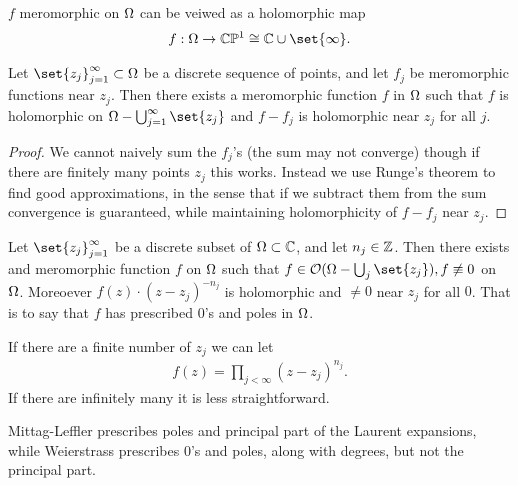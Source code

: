 \begin{remark}
    $f$ meromorphic on $\Omega$ can be veiwed as a holomorphic map
    \begin{align*}
        f: \om \to \C \mathbb{P}^1 \cong \C \cup \set{\infty}.
    \end{align*}
\end{remark}

\begin{theorem}
    Let $\set{z_j}_{j=1}^\infty \subset \om$ be a discrete sequence of points, and let $f_j$ be meromorphic functions near $z_j$. Then there exists a meromorphic function $f$ in $\Omega$ such that $f$ is holomorphic on $\om - \bigcup_{j=1}^\infty \set{z_j}$ and $f - f_j$ is holomorphic near $z_j$ for all $j$.
\end{theorem}


\begin{proof}
    We cannot naively sum the $f_j$'s (the sum may not converge) though if there are finitely many points $z_j$ this works. Instead we use Runge's theorem to find good approximations, in the sense that if we subtract them from the sum convergence is guaranteed, while maintaining holomorphicity of $f-f_j$ near $z_j$.
\end{proof}

\begin{theorem}
    Let $\set{z_j}_{j=1}^\infty$ be a discrete subset of $\Omega \subset \mathbb{C}$, and let $n_j \in \mathbb{Z}$. Then there exists and meromorphic function $f $ on $\Omega$ such that $f \in \O(\om - \bigcup_{j} \set{z_j}), f \not\equiv 0$ on $\Omega$. Moreoever $f(z) \cdot (z-z_j)^{-n_j}$ is holomorphic and $\neq 0$ near $z_j$ for all $0$. That is to say that $f$ has prescribed $0$'s and poles in $\Omega$.
\end{theorem}

\begin{note}
    If there are a finite number of $z_j$ we can let
    \begin{align*}
        f(z) = \prod_{j < \infty} (z-z_j)^{n_j}.
    \end{align*}
    If there are infinitely many it is less straightforward.
\end{note}

\begin{remark}
    Mittag-Leffler prescribes poles and principal part of the Laurent expansions, while Weierstrass prescribes $0$'s and poles, along with degrees, but not the principal part.
\end{remark}

